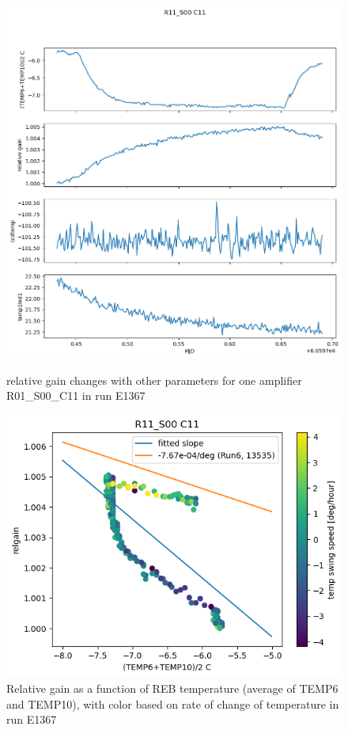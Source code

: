 \begin{figure}[htbp]
\centering
\begin{minipage}{0.45\textwidth}
    \centering
    \includegraphics[width=\textwidth]{figures/gaintemp/E1367RelgainParametersTrending.png}
    \caption{relative gain changes with other parameters for one amplifier R01\_S00\_C11 in run E1367}
    \label{fig:relgainparamE1367}
\end{minipage}
\hfill
\begin{minipage}{0.45\textwidth}
    \centering
    \includegraphics[width=\textwidth]{figures/gaintemp/E1367RelgainDetail.png}
    \caption{Relative gain as a function of REB temperature (average of TEMP6 and TEMP10), with color based on rate of change of temperature in run E1367}
    \label{fig:gaintempE1367}
\end{minipage}
\end{figure}

